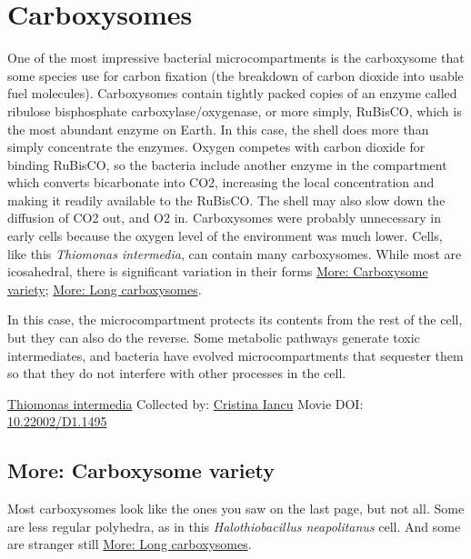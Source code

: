 \documentclass[]{tufte-book}
\begin{document}
\hypertarget{carboxysomes}{%
\section{Carboxysomes}\label{carboxysomes}}

One of the most impressive bacterial microcompartments is the carboxysome that some species use for carbon fixation (the breakdown of carbon dioxide into usable fuel molecules). Carboxysomes contain tightly packed copies of an enzyme called ribulose bisphosphate carboxylase/oxygenase, or more simply, RuBisCO, which is the most abundant enzyme on Earth. In this case, the shell does more than simply concentrate the enzymes. Oxygen competes with carbon dioxide for binding RuBisCO, so the bacteria include another enzyme in the compartment which converts bicarbonate into CO2, increasing the local concentration and making it readily available to the RuBisCO. The shell may also slow down the diffusion of CO2 out, and O2 in. Carboxysomes were probably unnecessary in early cells because the oxygen level of the environment was much lower. Cells, like this \emph{Thiomonas intermedia}, can contain many carboxysomes. While most are icosahedral, there is significant variation in their forms \protect\hyperlink{Carboxysome_variety}{More: Carboxysome variety}; \protect\hyperlink{Long_carboxysomes}{More: Long carboxysomes}.

In this case, the microcompartment protects its contents from the rest of the cell, but they can also do the reverse. Some metabolic pathways generate toxic intermediates, and bacteria have evolved microcompartments that sequester them so that they do not interfere with other processes in the cell.



\hypertarget{htmlwidget-f33defb9cea388c5779d}{}

\label{fig:4-7}\protect\hyperlink{tree}{Thiomonas intermedia} Collected by: \protect\hyperlink{cristina_iancu}{Cristina Iancu} Movie DOI: \href{https://doi.org/10.22002/D1.1495}{10.22002/D1.1495}

\hypertarget{Carboxysome_variety}{%
\subsection*{More: Carboxysome variety}\label{Carboxysome_variety}}

Most carboxysomes look like the ones you saw on the last page, but not all. Some are less regular polyhedra, as in this \emph{Halothiobacillus neapolitanus} cell. And some are stranger still \protect\hyperlink{Long_carboxysomes}{More: Long carboxysomes}.
\end{document}
